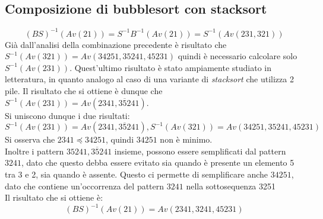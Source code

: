 \subsection{Composizione di {bubblesort} con {stacksort}}
$$(BS)^{-1}(Av(21))=S^{-1}B^{-1}(Av(21))=S^{-1}(Av(231,321))$$
Gi\`a dall'analisi della combinazione precedente \`e risultato che $S^{-1}(Av(321))=Av(34251, 35241, 45231)$ quindi \`e necessario calcolare solo $S^{-1}(Av(231))$. Quest'ultimo risultato \`e stato ampiamente studiato in letteratura, in quanto analogo al caso di una variante di \textit{stacksort} che utilizza 2 pile. Il risultato che si ottiene \`e dunque che $S^{-1}(Av(231))=Av(2341, 3\overline{5}241)$\cite{claesson2012sorting}.\\
Si uniscono dunque i due risultati:
$$S^{-1}(Av(231))=Av(2341,3\overline{5}241), S^{-1}(Av(321))=Av(34251, 35241, 45231)$$
Si osserva che $2341\preceq 34251$, quindi $34251$ non \`e minimo.\\
Inoltre i pattern $35241, 3\overline{5}241$ insieme, possono essere semplificati dal pattern $3241$, dato che questo debba essere evitato sia quando \`e presente un elemento 5 tra 3 e 2, sia quando \`e assente. Questo ci permette di semplificare anche $34251$, dato che contiene un'occorrenza del pattern $3241$ nella sottosequenza 3251\\
Il risultato che si ottiene \`e:
$$(BS)^{-1}(Av(21))=Av(2341,3241,45231)$$
